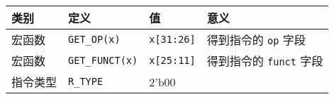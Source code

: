\begin{longtable}[]{@{}llll@{}}
\toprule
\begin{minipage}[b]{0.22\columnwidth}\raggedright
类别\strut
\end{minipage} & \begin{minipage}[b]{0.22\columnwidth}\raggedright
定义\strut
\end{minipage} & \begin{minipage}[b]{0.22\columnwidth}\raggedright
值\strut
\end{minipage} & \begin{minipage}[b]{0.22\columnwidth}\raggedright
意义\strut
\end{minipage}\tabularnewline
\midrule
\endhead
\begin{minipage}[t]{0.22\columnwidth}\raggedright
宏函数\strut
\end{minipage} & \begin{minipage}[t]{0.22\columnwidth}\raggedright
\texttt{GET\_OP(x)}\strut
\end{minipage} & \begin{minipage}[t]{0.22\columnwidth}\raggedright
\texttt{x{[}31:26{]}}\strut
\end{minipage} & \begin{minipage}[t]{0.22\columnwidth}\raggedright
得到指令的 \texttt{op} 字段\strut
\end{minipage}\tabularnewline
\begin{minipage}[t]{0.22\columnwidth}\raggedright
宏函数\strut
\end{minipage} & \begin{minipage}[t]{0.22\columnwidth}\raggedright
\texttt{GET\_FUNCT(x)}\strut
\end{minipage} & \begin{minipage}[t]{0.22\columnwidth}\raggedright
\texttt{x{[}25:11{]}}\strut
\end{minipage} & \begin{minipage}[t]{0.22\columnwidth}\raggedright
得到指令的 \texttt{funct} 字段\strut
\end{minipage}\tabularnewline
\begin{minipage}[t]{0.22\columnwidth}\raggedright
指令类型\strut
\end{minipage} & \begin{minipage}[t]{0.22\columnwidth}\raggedright
\texttt{R\_TYPE}\strut
\end{minipage} & \begin{minipage}[t]{0.22\columnwidth}\raggedright
2'b00\strut
\end{minipage} & \begin{minipage}[t]{0.22\columnwidth}\raggedright

\end{minipage}
\end{longtable}
